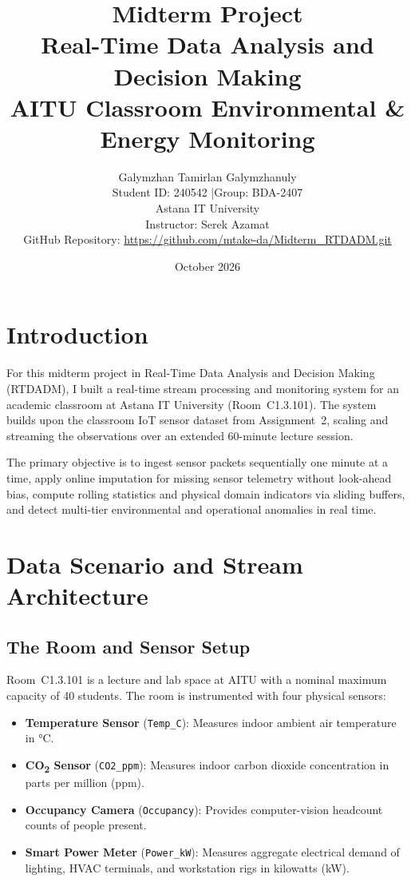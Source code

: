 \documentclass[12pt,a4paper]{article}
\title{
  \textbf{Midterm Project} \\
  Real-Time Data Analysis and Decision Making \\
  \large AITU Classroom Environmental \& Energy Monitoring
}
\author{
  Galymzhan Tamirlan Galymzhanuly \\
  Student ID: 240542 \quad|\quad Group: BDA-2407 \\
  Astana IT University \\
  Instructor: Serek Azamat \\
  \small {GitHub Repository:} \url{https://github.com/mtake-da/Midterm_RTDADM.git} \\[0.8em]
}
\date{October 2026}
\begin{document}
\maketitle
\tableofcontents
\newpage

\section{Introduction}

For this midterm project in Real-Time Data Analysis and Decision Making (RTDADM), I built a real-time stream processing and monitoring system for an academic classroom at Astana IT University (Room~C1.3.101). The system builds upon the classroom IoT sensor dataset from Assignment~2, scaling and streaming the observations over an extended 60-minute lecture session.

The primary objective is to ingest sensor packets sequentially one minute at a time, apply online imputation for missing sensor telemetry without look-ahead bias, compute rolling statistics and physical domain indicators via sliding buffers, and detect multi-tier environmental and operational anomalies in real time.

\section{Data Scenario and Stream Architecture}

\subsection{The Room and Sensor Setup}

Room~C1.3.101 is a lecture and lab space at AITU with a nominal maximum capacity of 40 students. The room is instrumented with four physical sensors:
\begin{itemize}
  \item \textbf{Temperature Sensor} (\texttt{Temp\_C}): Measures indoor ambient air temperature in °C.
  \item \textbf{CO\textsubscript{2} Sensor} (\texttt{CO2\_ppm}): Measures indoor carbon dioxide concentration in parts per million (ppm).
  \item \textbf{Occupancy Camera} (\texttt{Occupancy}): Provides computer-vision headcount counts of people present.
  \item \textbf{Smart Power Meter} (\texttt{Power\_kW}): Measures aggregate electrical demand of lighting, HVAC terminals, and workstation rigs in kilowatts (kW).
\end{itemize}
\end{document}
